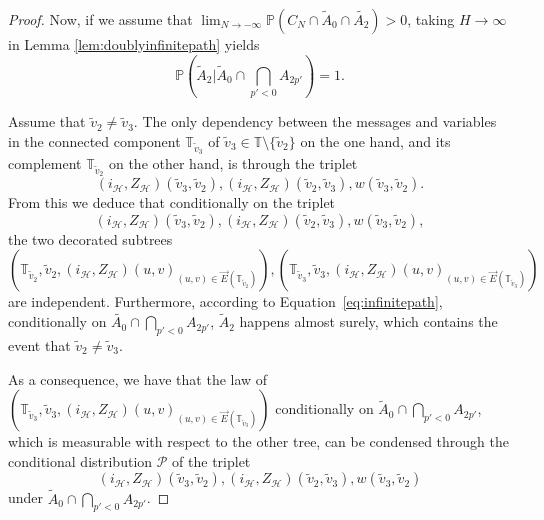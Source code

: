 \documentclass[10pt,a4paper]{amsart}
\begin{document}
\begin{proof}
Now, if we assume that $ \lim_{N \rightarrow -\infty} \mathbb{P}(C_{N}\cap \tilde{A}_0 \cap \tilde{A_2})>0$, taking $H \rightarrow \infty$ in Lemma \ref{lem:doublyinfinitepath} yields
\begin{equation}\label{eq:infinitepath}
 \mathbb{P}\left(  \tilde{A}_{2}  \bigg| \tilde A_0 \cap \bigcap_{p' < 0} A_{2p'}  \right) =1.
\end{equation}

Assume that $\tilde{v}_2\neq \tilde{v}_3$. The only dependency between the messages and variables in the connected component $\mathbb{T}_{\tilde{v}_{3}}$ of $\tilde{v}_{3} \in \mathbb{T}\setminus \{\tilde{v}_{2} \}$ on the one hand, and its complement $\mathbb T_{\tilde{v}_{2}}$ on the other hand, is through the triplet
\[(i_{\mathcal{H}},Z_{\mathcal{H}})(\tilde{v}_{3},\tilde{v}_{2}),(i_{\mathcal{H}},Z_{\mathcal{H}})(\tilde{v}_{2},\tilde{v}_{3}) ,w(\tilde{v}_{3},\tilde{v}_{2}). \] 
From this we deduce that conditionally on the triplet
\[(i_{\mathcal{H}},Z_{\mathcal{H}})(\tilde{v}_{3},\tilde{v}_{2}),(i_{\mathcal{H}},Z_{\mathcal{H}})(\tilde{v}_{2},\tilde{v}_{3}) ,w(\tilde{v}_{3},\tilde{v}_{2}), \]
 the two decorated subtrees \[\left(\mathbb{T}_{\tilde{v}_{2}},\tilde{v}_{2},(i_{\mathcal{H}},Z_{\mathcal{H}})(u,v)_{(u,v)\in \overset{\rightarrow}{E}(\mathbb{T}_{\tilde{v}_{2}})}\right),\left(\mathbb{T}_{\tilde{v}_{3}},\tilde{v}_{3},(i_{\mathcal{H}},Z_{\mathcal{H}})(u,v)_{(u,v)\in \overset{\rightarrow}{E}(\mathbb{T}_{\tilde{v}_{3}})}\right) \] are independent. Furthermore, according to Equation~\eqref{eq:infinitepath}, conditionally on $\tilde{A_0}\cap \bigcap_{p'<0}A_{2p'}$, $\tilde{A}_{2}$ happens almost surely, which contains the event that $\tilde{v}_2 \neq \tilde{v}_3$.
 
As a consequence, we have that the law of
$\left(\mathbb{T}_{\tilde{v}_{3}},\tilde{v}_{3},(i_{\mathcal{H}},Z_{\mathcal{H}})(u,v)_{(u,v)\in \overset{\rightarrow}{E}(\mathbb{T}_{\tilde{v}_{3}})}\right)$
conditionally on $\tilde A_0 \cap \bigcap_{p' < 0}A_{2p'}$, which is measurable with respect to the other tree, can be condensed through the conditional distribution $\mathcal{P}$ of the triplet  \[(i_{\mathcal{H}},Z_{\mathcal{H}})(\tilde{v}_{3},\tilde{v}_{2}),(i_{\mathcal{H}},Z_{\mathcal{H}})(\tilde{v}_{2},\tilde{v}_{3}) ,w(\tilde{v}_{3},\tilde{v}_{2}) \] under $\tilde A_0 \cap \bigcap_{p' < 0}A_{2p'}$.




\end{proof}
\end{document}
